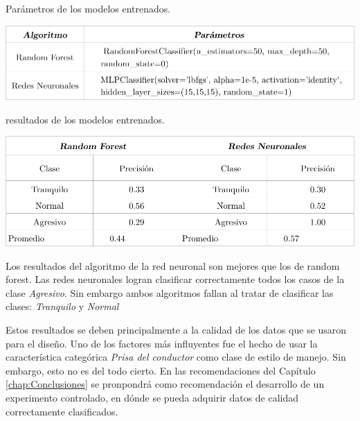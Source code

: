 \begin{table}[htbp!]
\centering
\caption{Parámetros de los modelos entrenados.}
\includegraphics[width=\textwidth]{param_modelo.pdf}
\label{diag:param_modelos}
\end{table}


\begin{table}[htbp!]
\centering
\caption{resultados de los modelos entrenados.}
\includegraphics[width=\textwidth]{results_modelo.pdf}
\label{diag:results_modelos}
\end{table}

Los resultados del algoritmo de la red neuronal son mejores que los de random forest. Las redes neuronales logran clasificar correctamente todos los casos de la clase \textit{Agresivo}. Sin embargo ambos algoritmos fallan al tratar de clasificar las clases: \textit{Tranquilo} y \textit{Normal}

Estos resultados se deben principalmente a la calidad de los datos que se usaron para el diseño. Uno de los factores más influyentes fue el hecho de usar la característica categórica \textit{Prisa del conductor} como clase  de estilo de manejo. Sin embargo, esto no es del todo cierto. En las recomendaciones del Capítulo \ref{chap:Conclusiones} se pronpondrá como recomendación el desarrollo de un experimento controlado, en dónde se pueda adquirir datos de calidad correctamente clasificados.

